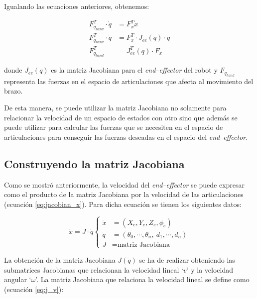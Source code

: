 Igualando las ecuaciones anteriores, obtenemos:

\begin{align*}
    F^T_{q_{hand}} \cdot{} \dot{q} &= F^T_x \dot{x} \\
    F^T_{q_{hand}} \cdot{} \dot{q} &= F^T_x \cdot{} J_{ee}\left(q\right) \cdot \dot{q} \\
    F^T_{q_{hand}} &= J^T_{ee}\left(q\right) \cdot F_x
\end{align*}

donde $J_{ee}\left(q\right)$ es la matriz Jacobiana para el \textit{end--effector}
del robot y $F_{q_{hand}}$ representa las fuerzas en el espacio de articulaciones
que afecta al movimiento del brazo.

De esta manera, se puede utilizar la matriz Jacobiana no solamente para relacionar
la velocidad de un espacio de estados con otro sino que además se puede utilizar
para calcular las fuerzas que se necesiten en el espacio de articulaciones para conseguir
las fuerzas deseadas en el espacio del \textit{end--effector}.

\subsection*{Construyendo la matriz Jacobiana}
Como se mostró anteriormente, la velocidad del \textit{end--effector} se puede
expresar como el producto de la matriz Jacobiana por la velocidad de las articulaciones
(ecuación \ref{eq:jacobian_x}). Para dicha ecuación se tienen los siguientes datos:

\begin{equation*}
    \dot{x} = J \cdot \dot{q}
    \left\{\begin{aligned}
        \dot{x} &= \left(X_e, Y_e, Z_e, \phi_e\right) \\
        \dot{q} &= \left(\theta_0, \cdots, \theta_n,~d_1, \cdots, d_n\right) \\
        J &= \text{matriz Jacobiana}
    \end{aligned}\right.
\end{equation*}

La obtención de la matriz Jacobiana $J\left(\dot{q}\right)$ se ha de realizar obteniendo
las submatrices Jacobianas que relacionan la velocidad lineal `$v$' y la velocidad angular
`$\omega$'. La matriz Jacobiana que relaciona la velocidad lineal se define como
(ecuación \ref{eq:j_v}):

